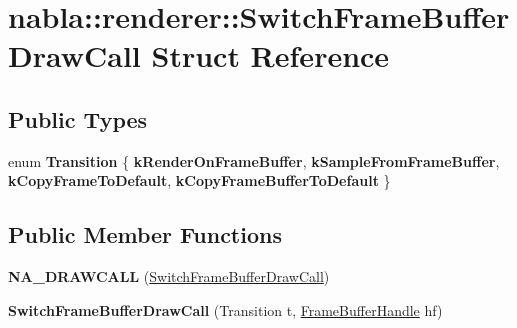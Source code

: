 \hypertarget{structnabla_1_1renderer_1_1_switch_frame_buffer_draw_call}{}\section{nabla\+::renderer\+::Switch\+Frame\+Buffer\+Draw\+Call Struct Reference}
\label{structnabla_1_1renderer_1_1_switch_frame_buffer_draw_call}
\subsection*{Public Types}
\begin{DoxyCompactItemize}
\item 
\mbox{\label{structnabla_1_1renderer_1_1_switch_frame_buffer_draw_call_a3a9e11f095d4f0b5171a27e24cd7ca39}} 
enum {\bfseries Transition} \{ {\bfseries k\+Render\+On\+Frame\+Buffer}, 
{\bfseries k\+Sample\+From\+Frame\+Buffer}, 
{\bfseries k\+Copy\+Frame\+To\+Default}, 
{\bfseries k\+Copy\+Frame\+Buffer\+To\+Default}
 \}
\end{DoxyCompactItemize}
\subsection*{Public Member Functions}
\begin{DoxyCompactItemize}
\item 
\mbox{\label{structnabla_1_1renderer_1_1_switch_frame_buffer_draw_call_a387f4249436def4c782c0b2a3dc4b029}} 
{\bfseries N\+A\+\_\+\+D\+R\+A\+W\+C\+A\+LL} (\mbox{\hyperlink{structnabla_1_1renderer_1_1_switch_frame_buffer_draw_call}{Switch\+Frame\+Buffer\+Draw\+Call}})
\item 
\mbox{\label{structnabla_1_1renderer_1_1_switch_frame_buffer_draw_call_a1c6b28c555eb463bc8c0413b75db02c2}} 
{\bfseries Switch\+Frame\+Buffer\+Draw\+Call} (Transition t, \mbox{\hyperlink{classnabla_1_1renderer_1_1_handle}{Frame\+Buffer\+Handle}} hf)
\end{DoxyCompactItemize}
